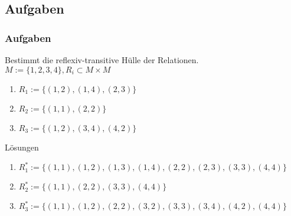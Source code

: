 \subsection{Aufgaben}
\begin{frame}
	\frametitle{Aufgaben}
  \begin{exampleblock}{}
    Bestimmt die reflexiv-transitive Hülle der Relationen.\\
    $M := \{1, 2, 3, 4\}, R_i \subset M \times M$
    \begin{enumerate}
      \item $R_1 := \{(1, 2), (1, 4), (2, 3)\}$
      \item $R_2 := \{(1, 1), (2, 2)\}$
      \item $R_3 := \{(1, 2), (3, 4), (4, 2)\}$
    \end{enumerate}
  \end{exampleblock}\pause
  \begin{exampleblock}{Lösungen}
    \begin{enumerate}
      \item $R_1^* := \{(1, 1), (1, 2), (1, 3), (1, 4), (2, 2), (2, 3), (3, 3), (4, 4)\}$
      \item $R_2^* := \{(1, 1), (2, 2), (3, 3), (4, 4)\}$
      \item $R_3^* := \{(1, 1), (1, 2), (2, 2), (3, 2), (3, 3), (3, 4), (4, 2), (4, 4)\}$
    \end{enumerate}
  \end{exampleblock}
\end{frame}
